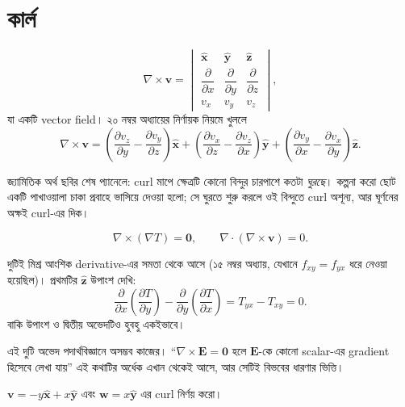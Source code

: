 \documentclass[11pt]{article}
\begin{document}
\section{কার্ল}

\begin{idea}[Curl]
\[
  \nabla\times\mathbf{v} =
  \begin{vmatrix}
    \hat{\mathbf{x}} & \hat{\mathbf{y}} & \hat{\mathbf{z}} \\[1mm]
    \dfrac{\partial}{\partial x} & \dfrac{\partial}{\partial y}
    & \dfrac{\partial}{\partial z} \\[1mm]
    v_{x} & v_{y} & v_{z}
  \end{vmatrix} ,
\]
যা একটি vector field। ২০ নম্বর অধ্যায়ের নির্ণায়ক নিয়মে খুললে
\[
  \nabla\times\mathbf{v}
  = \left( \frac{\partial v_{z}}{\partial y}
  - \frac{\partial v_{y}}{\partial z} \right)\hat{\mathbf{x}}
  + \left( \frac{\partial v_{x}}{\partial z}
  - \frac{\partial v_{z}}{\partial x} \right)\hat{\mathbf{y}}
  + \left( \frac{\partial v_{y}}{\partial x}
  - \frac{\partial v_{x}}{\partial y} \right)\hat{\mathbf{z}} .
\]
\end{idea}

জ্যামিতিক অর্থ ছবির শেষ প্যানেলে: curl মাপে ক্ষেত্রটি কোনো বিন্দুর চারপাশে
কতটা \emph{ঘুরছে}। কল্পনা করো ছোট একটি পাখাওয়ালা চাকা প্রবাহে ভাসিয়ে দেওয়া
হলো; সে ঘুরতে শুরু করলে ওই বিন্দুতে curl অশূন্য, আর ঘূর্ণনের অক্ষই curl-এর
দিক।

\begin{idea}[দুটি অভেদ]
\[
  \nabla\times\left( \nabla T \right) = \mathbf{0}, \qquad
  \nabla\cdot\left( \nabla\times\mathbf{v} \right) = 0 .
\]
\end{idea}

দুটিই মিশ্র আংশিক derivative-এর সমতা থেকে আসে (১৫ নম্বর অধ্যায়, যেখানে
$f_{xy} = f_{yx}$ ধরে নেওয়া হয়েছিল)। প্রথমটির $\hat{\mathbf{z}}$ উপাংশ
দেখি:
\[
  \frac{\partial}{\partial x}\left( \frac{\partial T}{\partial y} \right)
  - \frac{\partial}{\partial y}\left( \frac{\partial T}{\partial x} \right)
  = T_{yx} - T_{xy} = 0 .
\]
বাকি উপাংশ ও দ্বিতীয় অভেদটিও হুবহু একইভাবে।

এই দুটি অভেদ পদার্থবিজ্ঞানে অসম্ভব কাজের। ``$\nabla\times\mathbf{E} =
\mathbf{0}$ হলে $\mathbf{E}$-কে কোনো scalar-এর gradient হিসেবে লেখা যায়''
এই কথাটির অর্ধেক এখান থেকেই আসে, আর সেটিই বিভবের ধারণার ভিত্তি।

\begin{example}
$\mathbf{v} = -y\hat{\mathbf{x}} + x\hat{\mathbf{y}}$ এবং
$\mathbf{w} = x\hat{\mathbf{y}}$ এর curl নির্ণয় করো।
\end{example}
\end{document}
